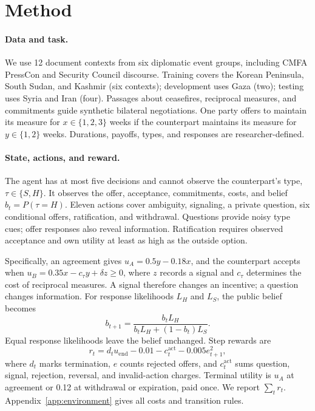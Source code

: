 \section{Method}

\paragraph{Data and task.}

We use 12 document contexts from six diplomatic event groups, including CMFA PressCon \citep{mochtak2021corpus} and Security Council discourse. Training covers the Korean Peninsula, South Sudan, and Kashmir (six contexts); development uses Gaza (two); testing uses Syria and Iran (four). Passages about ceasefires, reciprocal measures, and commitments guide synthetic bilateral negotiations. One party offers to maintain its measure for $x\in\{1,2,3\}$ weeks if the counterpart maintains its measure for $y\in\{1,2\}$ weeks. Durations, payoffs, types, and responses are researcher-defined.

\paragraph{State, actions, and reward.}

The agent has at most five decisions and cannot observe the counterpart's type, $\tau\in\{S,H\}$. It observes the offer, acceptance, commitments, costs, and belief $b_t=P(\tau=H)$. Eleven actions cover ambiguity, signaling, a private question, six conditional offers, ratification, and withdrawal. Questions provide noisy type cues; offer responses also reveal information. Ratification requires observed acceptance and own utility at least as high as the outside option.

Specifically, an agreement gives $u_A=0.5y-0.18x$, and the counterpart accepts when $u_B=0.35x-c_\tau y+\delta z\geq0$, where $z$ records a signal and $c_\tau$ determines the cost of reciprocal measures. A signal therefore changes an incentive; a question changes information. For response likelihoods $L_H$ and $L_S$, the public belief becomes
\begin{equation}
 b_{t+1}=\frac{b_tL_H}{b_tL_H+(1-b_t)L_S}.
\end{equation}
Equal response likelihoods leave the belief unchanged. Step rewards are
\begin{equation}
 r_t=d_tu_{\mathrm{end}}-0.01-c^{\mathrm{act}}_t-0.005e_{t+1}^2,
\end{equation}
where $d_t$ marks termination, $e$ counts rejected offers, and $c^{\mathrm{act}}_t$ sums question, signal, rejection, reversal, and invalid-action charges. Terminal utility is $u_A$ at agreement or 0.12 at withdrawal or expiration, paid once. We report $\sum_t r_t$. Appendix~\ref{app:environment} gives all costs and transition rules.

